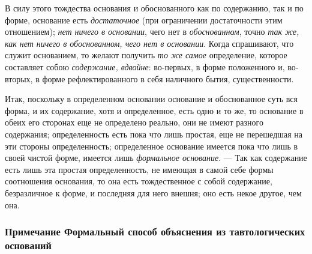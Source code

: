 В силу этого тождества основания и обоснованного как по содержанию, так и по
форме, основание есть {\em достаточное} (при
ограничении достаточности этим отношением); {\em нет
ничего в основании}, чего нет в {\em обоснованном},
точно {\em так же, как нет ничего в обоснованном, чего
нет в основании}. Когда спрашивают, что служит основанием, то желают
получить {\em то же самое} определение, которое
составляет собою {\em содержание, вдвойне}: во-первых,
в форме положенного и, во-вторых, в форме рефлектированного в себя
наличного бытия, существенности.

Итак, поскольку в определенном основании основание и обоснованное суть вся
форма, и их содержание, хотя и определенное, есть одно и то же, то
основание в обеих его сторонах еще не определено реально, они не имеют
разного содержания; определенность есть пока что лишь простая, еще не
перешедшая на эти стороны определенность; определенное основание имеется
пока что лишь в своей чистой форме, имеется лишь
{\em формальное основание}. — Так как содержание есть
лишь эта простая определенность, не имеющая в самой себе формы соотношения
основания, то она есть тождественное с собой содержание, безразличное к
форме, и последняя для него внешня; оно есть некое другое, чем она.


\subsubsection[Примечание Формальный способ объяснения из тавтологических оснований]
{Примечание Формальный способ объяснения из тавтологических оснований}

